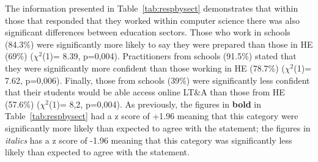 \documentclass[sigconf]{acmart}
\begin{document}
The information presented in Table~\ref{tab:respbysect} demonstrates
that within those that responded that they worked within computer
science there was also significant differences between education
sectors. Those who work in schools (84.3\%) were significantly more
likely to say they were prepared than those in HE (69\%) ($\chi^2$(1)=
8.39, p=0,004). Practitioners from schools (91.5\%) stated that they
were significantly more confident than those working in HE (78.7\%)
($\chi^2$(1)= 7.62, p=0,006). Finally, those from schools (39\%) were
significantly less confident that their students would be able access
online LT\&A than those from HE (57.6\%) ($\chi^2$(1)= 8,2,
p=0,004). As previously, the figures in {\textbf{bold}} in
Table~\ref{tab:respbysect} had a z score of +1.96 meaning that this
category were significantly more likely than expected to agree with
the statement; the figures in {\emph{italics}} has a z score of -1.96
meaning that this category was significantly less likely than expected
to agree with the statement.

\begin{table*}[]
\caption{Responses to statements by sector (*number of percent of those agreeing with statement compared to disagreeing)}
\label{tab:respbysect}
\end{table*}
\end{document}
